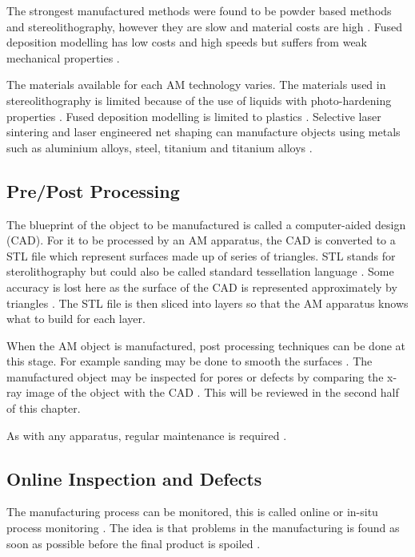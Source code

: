The strongest manufactured methods were found to be powder based methods and stereolithography, however they are slow and material costs are high \citep{kim2008benchmark}. Fused deposition modelling has low costs and high speeds but suffers from weak mechanical properties \citep{ngo2018additive}.

The materials available for each AM technology varies. The materials used in stereolithography is limited because of the use of liquids with photo-hardening properties \citep{ngo2018additive}. Fused deposition modelling is limited to plastics \citep{ngo2018additive}. Selective laser sintering and laser engineered net shaping can manufacture objects using metals such as aluminium alloys, steel, titanium and titanium alloys \citep{herzog2016additive}.

\subsection{Pre/Post Processing}

The blueprint of the object to be manufactured is called a computer-aided design (CAD). For it to be processed by an AM apparatus, the CAD is converted to a STL file \citep{3d1989sterolithography, 3d2019what} which represent surfaces made up of series of triangles. STL stands for sterolithography but could also be called standard tessellation language \citep{wong2012review}. Some accuracy is lost here as the surface of the CAD is represented approximately by triangles \citep{gibson2010additive}. The STL file is then sliced into layers \citep{jamieson1995direct, vatani2009enhanced} so that the AM apparatus knows what to build for each layer.

When the AM object is manufactured, post processing techniques can be done at this stage. For example sanding may be done to smooth the surfaces \citep{gibson2010additive}. The manufactured object may be inspected for pores or defects by comparing the x-ray image of the object with the CAD \citep{lee2015compliance, villarraga2015assessing, kim2016inspection}. This will be reviewed in the second half of this chapter.

As with any apparatus, regular maintenance is required \citep{bell2014maintaining}.

\subsection{Online Inspection and Defects}

The manufacturing process can be monitored, this is called online or in-situ process monitoring \citep{everton2016review}. The idea is that problems in the manufacturing is found as soon as possible before the final product is spoiled \citep{cerniglia2015inspection}.

